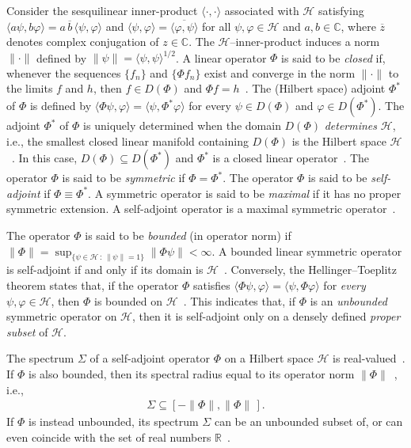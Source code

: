 \documentclass[leqno,onefignum,onetabnum]{siamltex1213}
\newcommand{\Hs}{\mathscr{H}}
\begin{document}
Consider the sesquilinear inner-product $\langle\cdot,\cdot\rangle$ associated with $\Hs$
satisfying $\langle a\psi,b\varphi\rangle=a\,\overline{b}\,\langle\psi,\varphi\rangle$ and
$\langle\psi,\varphi\rangle=\overline{\langle\varphi,\psi\rangle}$ for all $\psi,\varphi\in\Hs$ and $a,b\in\mathbb{C}$, where
$\overline{z}$ denotes complex conjugation of $z\in\mathbb{C}$.
The $\Hs$--inner-product induces a norm $\|\cdot\|$ defined by
$\|\psi\|=\langle\psi,\psi\rangle^{1/2}$. A linear operator $\Phi$ is said to be \emph{closed}
if, whenever the sequences $\{f_n\}$ and $\{\Phi f_n\}$ exist and converge in
the norm $\|\cdot\|$ to the limits $f$ and $h$, then $f\in D(\Phi)$ and $\Phi
f=h$~\cite{Stone:64}. The (Hilbert space) adjoint $\Phi^*$ of $\Phi$ is 
defined by $\langle\Phi\psi,\varphi\rangle=\langle\psi,\Phi^*\varphi\rangle$ for every $\psi\in D(\Phi)$ and $\varphi\in D(\Phi^*)$. The
adjoint $\Phi^*$ of $\Phi$ is uniquely determined when the domain $D(\Phi)$
\emph{determines} $\Hs$, i.e., the smallest closed linear manifold
containing $D(\Phi)$ is the Hilbert space $\Hs$~\cite{Stone:64}. In this
case, $D(\Phi)\subseteq D(\Phi^*)$ and $\Phi^*$ is a closed linear
operator~\cite{Stone:64}. The operator $\Phi$ is said to be
\emph{symmetric} if $\Phi=\Phi^*$. The operator $\Phi$ is said to be
\emph{self-adjoint} if $\Phi\equiv\Phi^*$. A symmetric operator is said to be
\emph{maximal} if it has no proper symmetric extension. A self-adjoint
operator is a maximal symmetric operator~\cite{Stone:64}. 



The operator $\Phi$ is said to be \emph{bounded} (in operator norm) if
$\|\Phi\|=\sup_{\{\psi\in\Hs   \,:\, \|\psi\|=1\}}\|\Phi\psi\|<\infty$. A bounded linear symmetric
operator is self-adjoint if and only if its domain is
$\Hs$~\cite{Stone:64}. Conversely, the Hellinger--Toeplitz theorem
states that, if the operator $\Phi$ satisfies $\langle\Phi\psi,\varphi\rangle=\langle\psi,\Phi\varphi\rangle$ for \emph{every}
$\psi,\varphi\in\Hs$, then $\Phi$ is bounded on
$\Hs$~\cite{Reed-1980,Stone:64}. This indicates that, if $\Phi$ is an
\emph{unbounded} symmetric operator on $\Hs$, then it is self-adjoint
only on a densely defined \emph{proper subset} of $\Hs$. 



The spectrum $\Sigma$ of a self-adjoint operator $\Phi$ on a Hilbert space
$\Hs$ is real-valued~\cite{Reed-1980,Stone:64}. If $\Phi$ is also bounded,
then its spectral radius equal to its operator norm
$\|\Phi\|$~\cite{Reed-1980}, i.e., 
%
\begin{align}\label{eq:Spectral_Radius_Phi}
  \Sigma\subseteq[-\|\Phi\|,\|\Phi\|\,].
\end{align}
%
If $\Phi$ is instead unbounded, its spectrum $\Sigma$ can be an unbounded subset of,
or can even coincide with the set of real numbers
$\mathbb{R}$~\cite{Stone:64}.
\end{document}
